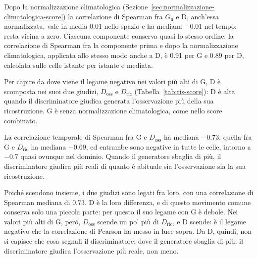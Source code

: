 Dopo la normalizzazione climatologica (Sezione~\ref{sec:normalizzazione-climatologica-score}) la correlazione di Spearman fra $G_{\mathrm{n}}$ e D, anch'essa normalizzata, vale in media $0.01$ nello spazio e ha mediana $-0.01$ nel tempo: resta vicina a zero. Ciascuna componente conserva quasi lo stesso ordine: la correlazione di Spearman fra la componente prima e dopo la normalizzazione climatologica, applicata allo stesso modo anche a D, è 0.91 per G e 0.89 per D, calcolata sulle celle istante per istante e mediata.


Per capire da dove viene il legame negativo nei valori più alti di G, D è scomposta nei suoi due giudizi, $D_{\mathrm{oss}}$ e $D_{\mathrm{ric}}$ (Tabella~\ref{tab:ris-score}): D è alta quando il discriminatore giudica generata l'osservazione più della sua ricostruzione. G è senza normalizzazione climatologica, come nello score combinato.

La correlazione temporale di Spearman fra G e $D_{\mathrm{oss}}$ ha mediana $-0.73$, quella fra G e $D_{\mathrm{ric}}$ ha mediana $-0.69$, ed entrambe sono negative in tutte le celle, intorno a $-0.7$ quasi ovunque nel dominio. Quando il generatore sbaglia di più, il discriminatore giudica più reali di quanto è abituale sia l'osservazione sia la sua ricostruzione.


Poiché scendono insieme, i due giudizi sono legati fra loro, con una correlazione di Spearman mediana di $0.73$. D è la loro differenza, e di questo movimento comune conserva solo una piccola parte: per questo il suo legame con G è debole. Nei valori più alti di G, però, $D_{\mathrm{oss}}$ scende un po' più di $D_{\mathrm{ric}}$, e D scende: è il legame negativo che la correlazione di Pearson ha messo in luce sopra. Da D, quindi, non si capisce che cosa segnali il discriminatore: dove il generatore sbaglia di più, il discriminatore giudica l'osservazione più reale, non meno.


